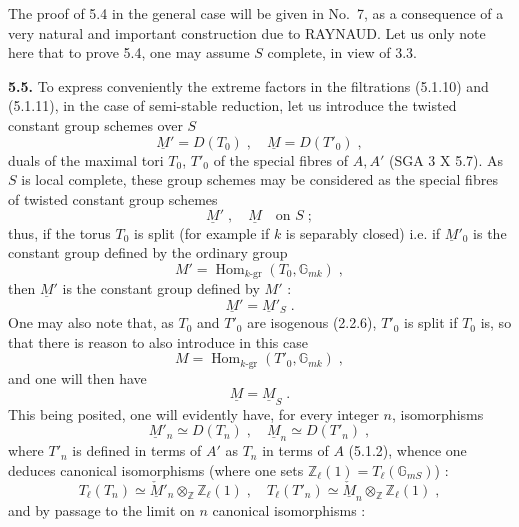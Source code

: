 \documentclass[11pt]{article}
\theoremstyle{plain}
\theoremstyle{definition}
\theoremstyle{remark}
\newcommand{\GG}{\mathbb G}
\newcommand{\ZZ}{\mathbb Z}
\DeclareMathOperator{\Hom}{Hom}
\newcommand{\Tl}{T_\ell}
\begin{document}
The proof of 5.4 in the general case will be given in No.~7, as a
consequence of a very natural and important construction due to RAYNAUD.
Let us only note here that to prove 5.4, one may assume $S$ complete, in
view of 3.3.

\medskip

\noindent\textbf{5.5.} To express conveniently the extreme factors in
the filtrations (5.1.10) and (5.1.11), in the case of semi-stable
reduction, let us introduce the twisted constant group schemes over $S$
\begin{equation}
\underline{M}' = D(T_0) \; , \quad \underline{M} = D(T'_0) \; ,
\end{equation}
duals of the maximal tori $T_0$, $T'_0$ of the special fibres of $A, A'$
(SGA 3 X 5.7). As $S$ is local complete, these group schemes may be
considered as the special fibres of twisted constant group schemes
\begin{equation}
\underline{M}' \; , \quad \underline{M} \quad \text{on } S \; ;
\end{equation}
thus, if the torus $T_0$ is split (for example if $k$ is separably
closed) i.e. if $\underline{M}'_0$ is the constant group defined by the
ordinary group
\begin{equation}
M' = \Hom_{k\text{-gr}}(T_0, \GG_{mk}) \; ,
\end{equation}
then $\underline{M}'$ is the constant group defined by $M'$ :
\[
\underline{M}' = \underline{M}'_S \; .
\]
One may also note that, as $T_0$ and $T'_0$ are isogenous (2.2.6), $T'_0$
is split if $T_0$ is, so that there is reason to also introduce in this
case
\begin{equation}
M = \Hom_{k\text{-gr}}(T'_0, \GG_{mk}) \; ,
\end{equation}
and one will then have
\[
\underline{M} = \underline{M}_S \; .
\]
This being posited, one will evidently have, for every integer $n$,
isomorphisms
\begin{equation}
\underline{M}'_n \simeq D(T_n) \; , \quad \underline{M}_n \simeq
D(T'_n) \; ,
\end{equation}
where $T'_n$ is defined in terms of $A'$ as $T_n$ in terms of $A$
(5.1.2), whence one deduces canonical isomorphisms (where one sets
$\ZZ_{\ell}(1) = \Tl(\GG_{mS})$) :
\begin{equation}
\Tl(T_n) \simeq \check{\underline{M}}'_n \otimes_{\ZZ} \ZZ_{\ell}(1)
\; , \quad \Tl(T'_n) \simeq \check{\underline{M}}_n \otimes_{\ZZ}
\ZZ_{\ell}(1) \; ,
\end{equation}
and by passage to the limit on $n$ canonical isomorphisms :
\end{document}
